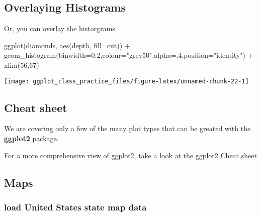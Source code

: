 \documentclass[
]{article}
\newenvironment{Shaded}{\begin{snugshade}}{\end{snugshade}}
\newcommand{\AttributeTok}[1]{\textcolor[rgb]{0.77,0.63,0.00}{#1}}
\newcommand{\DecValTok}[1]{\textcolor[rgb]{0.00,0.00,0.81}{#1}}
\newcommand{\FloatTok}[1]{\textcolor[rgb]{0.00,0.00,0.81}{#1}}
\newcommand{\FunctionTok}[1]{\textcolor[rgb]{0.00,0.00,0.00}{#1}}
\newcommand{\NormalTok}[1]{#1}
\newcommand{\SpecialCharTok}[1]{\textcolor[rgb]{0.00,0.00,0.00}{#1}}
\newcommand{\StringTok}[1]{\textcolor[rgb]{0.31,0.60,0.02}{#1}}
\begin{document}
\hypertarget{overlaying-histograms}{%
\subsection{Overlaying Histograms}\label{overlaying-histograms}}

Or, you can overlay the historgrams

\begin{Shaded}
\begin{Highlighting}[]
\FunctionTok{ggplot}\NormalTok{(diamonds, }\FunctionTok{aes}\NormalTok{(depth, }\AttributeTok{fill=}\NormalTok{cut)) }\SpecialCharTok{+} 
    \FunctionTok{geom\_histogram}\NormalTok{(}\AttributeTok{binwidth=}\FloatTok{0.2}\NormalTok{,}\AttributeTok{colour=}\StringTok{"grey50"}\NormalTok{,}\AttributeTok{alpha=}\NormalTok{.}\DecValTok{4}\NormalTok{,}\AttributeTok{position=}\StringTok{"identity"}\NormalTok{) }\SpecialCharTok{+} \FunctionTok{xlim}\NormalTok{(}\DecValTok{56}\NormalTok{,}\DecValTok{67}\NormalTok{)}
\end{Highlighting}
\end{Shaded}

\begin{center}\texttt{[image: ggplot\_class\_practice\_files/figure-latex/unnamed-chunk-22-1]} \end{center}

\hypertarget{cheat-sheet}{%
\subsection{Cheat sheet}\label{cheat-sheet}}

We are covering only a few of the many plot types that can be greated
with the \textbf{ggplot2} package.

For a more comprehensive view of ggplot2, take a look at the ggplot2
\href{https://r4ds.had.co.nz/data-visualisation.html}{Cheat sheet}

\hypertarget{maps}{%
\subsection{Maps}\label{maps}}

\hypertarget{load-united-states-state-map-data}{%
\subsubsection{load United States state map
data}\label{load-united-states-state-map-data}}
\end{document}

